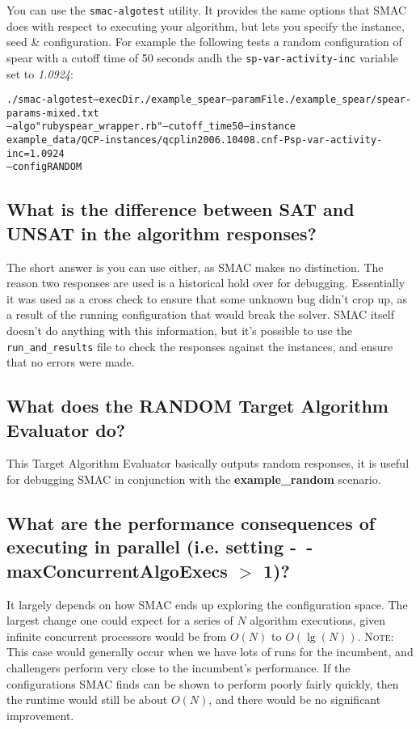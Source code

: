 \documentclass[11pt,letterpaper,oneside]{article}
\begin{document}
You can use the \texttt{smac-algotest} utility. It provides the same options that SMAC does with respect to executing your algorithm, but lets you specify the instance, seed \& configuration. For example the following tests a random configuration of spear with a cutoff time of 50 seconds andh the \texttt{sp-var-activity-inc} variable set to \emph{1.0924}:

{\footnotesize
\begin{alltt}
./smac-algotest --execDir ./example_spear --paramFile ./example_spear/spear-params-mixed.txt
 --algo "ruby spear_wrapper.rb"  --cutoff_time 50  --instance
  example_data/QCP-instances/qcplin2006.10408.cnf -Psp-var-activity-inc=1.0924
--config RANDOM
\end{alltt}}


\subsection{What is the difference between SAT and UNSAT in the algorithm responses?}

The short answer is you can use either, as SMAC makes no distinction. The reason two responses are used is a historical hold over for debugging. Essentially it was used as a cross check to ensure that some unknown bug didn't crop up, as a result of the running configuration that would break the solver. SMAC itself doesn't do anything with this information, but it's possible to use the \texttt{run\_and\_results} file to check the responses against the instances, and ensure that no errors were made.

\subsection{What does the RANDOM Target Algorithm Evaluator do?}

This Target Algorithm Evaluator basically outputs random responses, it is useful for debugging SMAC in conjunction with the \textbf{example\_random} scenario.

\subsection{What are the performance consequences of executing in parallel (i.e. setting \textbf{-~$\!$-maxConcurrentAlgoExecs} $>$ 1)?}
	
	It largely depends on how SMAC ends up exploring the configuration space. The largest change one could expect for a series of $N$ algorithm executions, given infinite concurrent processors would be from $O(N)$ to $O(\lg(N))$. \textsc{Note:} This case would generally occur when we have lots of runs for the incumbent, and challengers perform very close to the incumbent's performance. If the configurations SMAC finds can be shown to perform poorly fairly quickly, then the runtime would still be about $O(N)$, and there would be no significant improvement.
	
\end{document}
